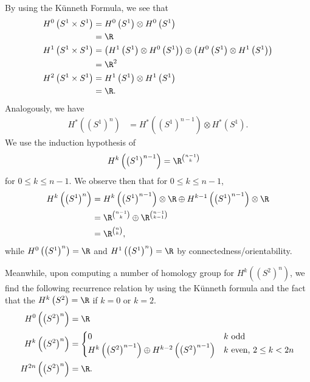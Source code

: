 \documentclass[10pt]{mypackage}
\begin{document}
\begin{solution}
  By using the Künneth Formula, we see that
  \begin{align*}
    H^{0}\left( S^{1}\times S^{1} \right) &= H^{0}\left( S^{1} \right)\otimes H^{0}\left( S^{1} \right)\\
                                          &= \R\\
    H^{1}\left( S^{1}\times S^{1} \right) &= \left( H^{1}\left( S^{1} \right)\otimes H^{0}\left( S^{1} \right) \right)\oplus \left( H^{0}\left( S^{1} \right)\otimes H^{1}\left( S^{1} \right) \right)\\
                                          &= \R^{2}\\
    H^{2}\left( S^{1}\times S^{1} \right) &= H^{1}\left( S^{1} \right)\otimes H^{1}\left( S^{1} \right)\\
                                          &= \R.
  \end{align*}
  Analogously, we have
  \begin{align*}
    H^{\ast}\left( \left( S^{1} \right)^{n} \right) &= H^{\ast}\left( \left( S^{1} \right)^{n-1} \right)\otimes H^{\ast}\left( S^{1} \right).
  \end{align*}
  We use the induction hypothesis of
  \begin{align*}
    H^{k}\left( \left( S^{1} \right)^{n-1} \right) &= \R^{{n-1}\choose k}
  \end{align*}
  for $0 \leq k \leq n-1$. We observe then that for $0\leq k\leq n-1$,
  \begin{align*}
    H^{k}\left( \left( S^1 \right)^{n} \right) &= H^{k}\left( \left( S^{1} \right)^{n-1} \right)\otimes \R \oplus H^{k-1}\left( \left( S^{1} \right)^{n-1} \right)\otimes \R\\
                                               &= \R^{{n-1}\choose k} \oplus \R^{{n-1}\choose {k-1}}\\
                                               &= \R^{n\choose k},
  \end{align*}
  while $H^{0}\left( \left( S^{1} \right)^{n} \right) = \R$ and $H^{1}\left( \left( S^{1} \right)^{n} \right) = \R$ by connectedness/orientability.\newline

  Meanwhile, upon computing a number of homology group for $H^{k}\left( \left( S^{2} \right)^{n} \right)$, we find the following recurrence relation by using the Künneth formula and the fact that the $H^{k}\left( S^{2} \right) = \R$ if $k =0$ or $k = 2$.
  \begin{align*}
    H^{0}\left( \left( S^{2} \right)^{n} \right) &= \R\\
    H^{k} \left( \left( S^{2} \right)^{n} \right) &= \begin{cases}
      0 & k\text{ odd}\\
      H^{k}\left( \left( S^{2} \right)^{n-1} \right)\oplus H^{k-2}\left( \left( S^{2} \right)^{n-1} \right) & k\text{ even, }2\leq k < 2n
    \end{cases}\\
      H^{2n}\left( \left( S^{2} \right)^{n} \right) &= \R.
  \end{align*}

\end{solution}
\end{document}
